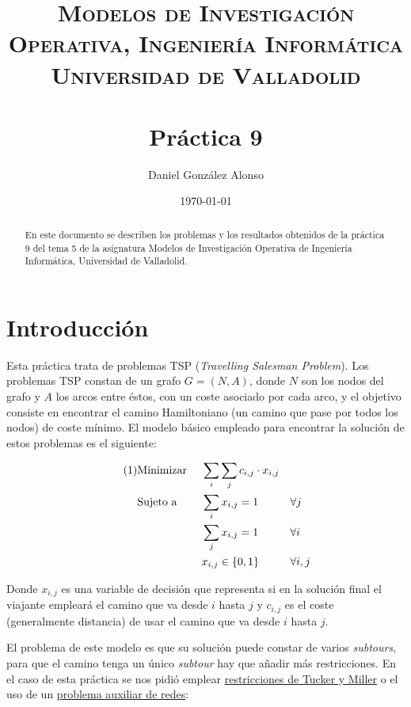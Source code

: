 \documentclass[a4paper,11pt]{article}
\title{
	\vspace{-25pt}
	\normalfont \Large \textsc{
		Modelos de Investigación Operativa,
        Ingeniería Informática\\
        Universidad de Valladolid
	}\\[10pt]
	\horrule{1pt}\\[10pt]
	\huge \textbf{
		Práctica 9
	}\\
	\horrule{1pt}
}
\author{
	\normalfont \Large Daniel González Alonso
}
\date{
	\normalfont \large \today
}
\newcommand\numberthis{							%
	\addtocounter{equation}{1}\tag{\theequation}
}
\begin{document}
\maketitle

\begin{abstract}
	En este documento se describen los problemas y los resultados obtenidos de la práctica 9 del tema 5 de la asignatura Modelos de Investigación Operativa de Ingeniería Informática, Universidad de Valladolid.
\end{abstract}

\section{Introducción}
Esta práctica trata de problemas TSP (\textit{Travelling Salesman Problem}). Los problemas TSP constan de un grafo ${G=(N,A)}$, donde ${N}$ son los nodos del grafo y ${A}$ los arcos entre éstos, con un coste asociado por cada arco, y el objetivo consiste en encontrar el camino Hamiltoniano (un camino que pase por todos los nodos) de coste mínimo. El modelo básico empleado para encontrar la solución de estos problemas es el siguiente:

\begin{align*}\numberthis
   	&\textrm{Minimizar }	&& \sum_{i}{ \sum_{j}{c_{i,j} \cdot x_{i,j}} }	&& \\
   	&\textrm{Sujeto a }		&& \sum_{i}{x_{i,j}} = 1	&& \forall j	\\
    &						&& \sum_{j}{x_{i,j}} = 1	&& \forall i	\\
	&						&& x_{i,j} \in \{0,1\}		&& \forall i,j	\\
\end{align*}

Donde ${x_{i,j}}$ es una variable de decisión que representa si en la solución final el viajante empleará el camino que va desde ${i}$ hasta ${j}$ y ${c_{i,j}}$ es el coste (generalmente distancia) de usar el camino que va desde ${i}$ hasta ${j}$.

El problema de este modelo es que su solución puede constar de varios \textit{subtours}, para que el camino tenga un único \textit{subtour} hay que añadir más restricciones. En el caso de esta práctica se nos pidió emplear \underline{restricciones de Tucker y Miller} o el uso de un \underline{problema auxiliar de redes}:
\end{document}

